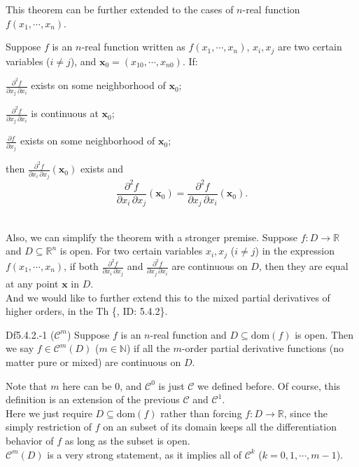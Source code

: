 \documentclass{article}
\newcommand{\parfrac}[2]{\frac{\partial #1}{\partial #2}}
\newcommand{\biparfrac}[2]{\frac{\partial^2 #1}{#2}}
\begin{document}
\begin{Rmk}{}
    This theorem can be further extended to the cases of $n$-real function $f(x_1, \cdots, x_n)$.\\ \textcolor{Th}{Suppose $f$ is an $n$-real function written as $f(x_1, \cdots, x_n)$, $x_i, x_j$ are two certain variables ($i\neq j$), and $\pmb{x}_0 = (x_{10}, \cdots, x_{n0})$. If:
    \begin{compactenum}
        \item $\biparfrac{f}{\partial x_j\,\partial x_i}$ exists on some neighborhood of $\pmb{x}_0$;
        \item $\biparfrac{f}{\partial x_j\,\partial x_i}$ is continuous at $\pmb{x}_0$;
        \item $\parfrac{f}{x_j}$ exists on some neighborhood of $\pmb{x}_0$;
    \end{compactenum}
    then $\biparfrac{f}{\partial x_i\,\partial x_j}(\pmb{x}_0)$ exists and
    $$ \biparfrac{f}{\partial x_i\,\partial x_j}(\pmb{x}_0) = \biparfrac{f}{\partial x_j\,\partial x_i}(\pmb{x}_0). $$} \\
    Also, we can simplify the theorem with a stronger premise. \textcolor{Th}{Suppose $f: D\rightarrow\mathbb{R}$ and $D\subseteq\mathbb{R}^n$ is open. For two certain variables $x_i, x_j$ ($i\neq j$) in the expression $f(x_1, \cdots, x_n)$, if both $\biparfrac{f}{\partial x_i\,\partial x_j}$ and $\biparfrac{f}{\partial x_j\,\partial x_i}$ are continuous on $D$, then they are equal at any point $\pmb{x}$ in $D$.} \\
    And we would like to further extend this to the mixed partial derivatives of higher orders, in the Th \{, ID: 5.4.2\}. 
\end{Rmk}

\begin{Df}{Df5.4.2.-1 ($\mathcal{C}^m$)}
    Suppose $f$ is an $n$-real function and $D\subseteq\text{dom}(f)$ is open. Then we say $f\in\mathcal{C}^m(D)$ ($m\in\mathbb{N}$) if all the $m$-order partial derivative functions (no matter pure or mixed) are continuous on $D$.
\end{Df}

\begin{Rmk}{}
    Note that $m$ here can be $0$, and $\mathcal{C}^0$ is just $\mathcal{C}$ we defined before. Of course, this definition is an extension of the previous $\mathcal{C}$ and $\mathcal{C}^1$.\\
    Here we just require $D\subseteq\text{dom}(f)$ rather than forcing $f: D\rightarrow\mathbb{R}$, since the simply restriction of $f$ on an subset of its domain keeps all the differentiation behavior of $f$ as long as the subset is open. \\
    \textcolor{Th}{$\mathcal{C}^m(D)$ is a very strong statement, as it implies all of $\mathcal{C}^k$ ($k=0,1,\cdots, m-1$).}
\end{Rmk}
\end{document}
